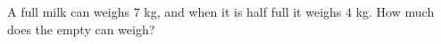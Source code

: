 A full milk can weighs $7$ kg, and when it is half full it weighs $4$ kg. How much does the empty can weigh?
